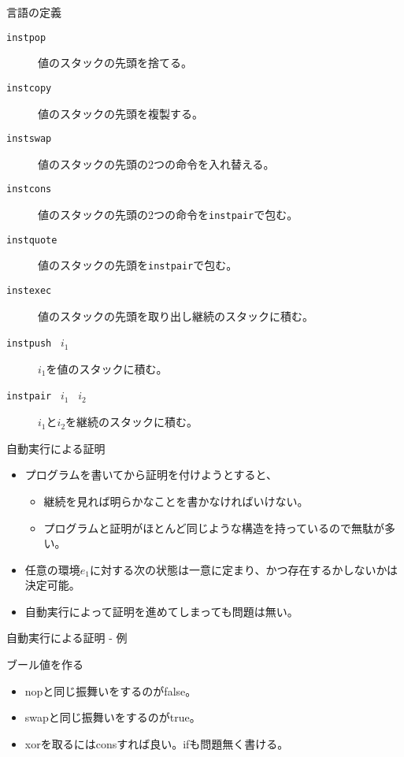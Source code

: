 \documentclass[cjk, 14pt]{beamer}
\begin{document}
\begin{frame}{言語の定義}

  \begin{description}
    \item[\texttt{instpop}] 値のスタックの先頭を捨てる。
    \item[\texttt{instcopy}] 値のスタックの先頭を複製する。
    \item[\texttt{instswap}] 値のスタックの先頭の2つの命令を入れ替える。
    \item[\texttt{instcons}] 値のスタックの先頭の2つの命令を\texttt{instpair}で包む。
    \item[\texttt{instquote}] 値のスタックの先頭を\texttt{instpair}で包む。
    \item[\texttt{instexec}] 値のスタックの先頭を取り出し継続のスタックに積む。
    \item[\texttt{instpush} \, $i_1$] $i_1$を値のスタックに積む。
    \item[\texttt{instpair} \, $i_1$ \, $i_2$] $i_1$と$i_2$を継続のスタックに積む。
  \end{description}

\end{frame}

\begin{frame}{自動実行による証明}

  \begin{itemize}
    \item プログラムを書いてから証明を付けようとすると、
    \begin{itemize}
      \item 継続を見れば明らかなことを書かなければいけない。
      \item プログラムと証明がほとんど同じような構造を持っているので無駄が多い。
    \end{itemize}
    \item 任意の環境$e_1$に対する次の状態は一意に定まり、かつ存在するかしないかは決定可能。
    \item 自動実行によって証明を進めてしまっても問題は無い。
  \end{itemize}

\end{frame}

\begin{frame}{自動実行による証明 - 例}

\end{frame}

\begin{frame}{ブール値を作る}

  \begin{itemize}
    \item nopと同じ振舞いをするのがfalse。
    \item swapと同じ振舞いをするのがtrue。
    \item xorを取るにはconsすれば良い。ifも問題無く書ける。
  \end{itemize}

\end{frame}
\end{document}
